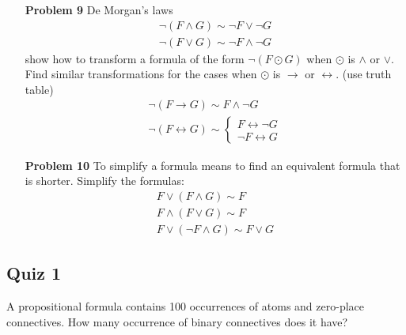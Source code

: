 \begin{enumerate}
\item[\textbf{Problem 9}] De Morgan's laws
\begin{gather*}
 \neg ( F \wedge G) \sim \neg F \vee \neg G \\
 \neg ( F \vee G) \sim \neg F \wedge \neg G
\end{gather*}
show how to transform a formula of the form $\neg (F \odot G)$ when $\odot$ is $\wedge$ or $\vee$. Find similar transformations for the cases when $\odot$ is $\rightarrow$ or $\leftrightarrow$. (use truth table)
 \begin{gather*}
     \neg (F \rightarrow G) \sim F \wedge \neg G   \\
     \neg (F \leftrightarrow G) \sim \left\{
        \begin{array}{c}      
        F \leftrightarrow \neg G\\
        \neg F \leftrightarrow G
        \end{array}\right.
 \end{gather*}

\item[\textbf{Problem 10}] To simplify a formula means to find an equivalent formula that is shorter. Simplify the formulas: 
\begin{gather*} 
 F \vee ( F \wedge G) \sim F \\
 F \wedge (F \vee G) \sim F \\
 F \vee (\neg F \wedge G) \sim F \vee G
\end{gather*}
 \end{enumerate}
 
\subsection{Quiz 1}
A propositional formula contains 100 occurrences of atoms and zero-place connectives. How many occurrence of binary connectives does it have? \\


